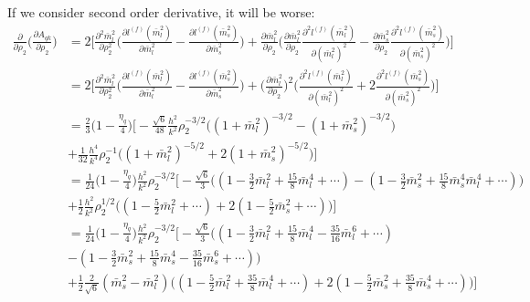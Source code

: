 \documentclass[12pt]{article}
\begin{document}
If we consider second order derivative, it will be worse:
\begin{equation}
\begin{split}
\frac{\partial}{\partial \rho_2}\Big(\frac{\partial A_{qk}}{\partial \rho_2}\Big)
&= 2 \Big[\frac{\partial^2 \bar m_l^2}{\partial \rho_2^2}\Big(\frac{\partial l^{(f)}(\bar m_l^2)}{\partial \bar m_l^2} - \frac{\partial l^{(f)}(\bar m_s^2)}{\partial \bar m_s^2}\Big)
+ \frac{\partial \bar m_l^2}{\partial \rho_2} \Big(\frac{\partial \bar m_l^2}{\partial \rho_2} \frac{\partial^2 l^{(f)}(\bar m_l^2)}{\partial (\bar m_l^2)^2} - \frac{\partial \bar m_s^2}{\partial \rho_2} \frac{\partial^2 l^{(f)}(\bar m_s^2)}{\partial (\bar m_s^2)^2 }\Big) \Big]\\
&= 2 \Big[\frac{\partial^2 \bar m_l^2}{\partial \rho_2^2}\Big(\frac{\partial l^{(f)}(\bar m_l^2)}{\partial \bar m_l^2} - \frac{\partial l^{(f)}(\bar m_s^2)}{\partial \bar m_s^2}\Big)
+\Big(\frac{\partial \bar m_l^2}{\partial \rho_2}\Big)^2\Big(\frac{\partial^2 l^{(f)}(\bar m_l^2)}{\partial (\bar m_l^2)^2} + 2 \frac{\partial^2 l^{(f)}(\bar m_s^2)}{\partial (\bar m_s^2)^2 }\Big) \Big]\\
&=\frac{2}{3}\Big(1-\frac{\eta_q}{4}\Big)\Big[-\frac{\sqrt{6}}{48} \frac{h^2}{k^2} \rho_2^{-3/2} \big((1+\bar m_l^2 )^{-3/2}-(1+\bar m_s^2)^{-3/2}\big ) \\
&+\frac{1}{32}\frac{h^4}{k^4}\rho_2^{-1}\big( (1+\bar m_l^2 )^{-5/2} +2 (1+\bar m_s^2)^{-5/2}\big)\Big]\\
&=\frac{1}{24}\Big(1-\frac{\eta_q}{4}\Big)\frac{h^2}{k^2}\rho_2^{-3/2} \Big[-\frac{\sqrt{6}}{3} \big((1-\frac{3}{2} \bar m_l^2 + \frac{15}{8} \bar m_l^4 +\cdots )-(1-\frac{3}{2}\bar m_s^2 + \frac{15}{8} \bar m_s^4 \bar m_l^4 + \cdots)\big ) \\
&+\frac{1}{2}\frac{h^2}{k^2}\rho_2^{1/2}\big( (1-\frac{5}{2}\bar m_l^2 + \cdots) + 2(1-\frac{5}{2}\bar m_s^2 +\cdots)\big)\Big]\\
&=\frac{1}{24}\Big(1-\frac{\eta_q}{4}\Big)\frac{h^2}{k^2}\rho_2^{-3/2} \Big[-\frac{\sqrt{6}}{3} \big((1-\frac{3}{2} \bar m_l^2 + \frac{15}{8} \bar m_l^4 -\frac{35}{16}\bar m_l^6 +\cdots )\\
&-(1-\frac{3}{2}\bar m_s^2 + \frac{15}{8} \bar m_s^4 -\frac{35}{16}\bar m_s^6 + \cdots)\big ) \\
&+\frac{1}{2}\frac{2}{\sqrt{6}}(\bar m_s^2 - \bar m_l^2)\big( (1-\frac{5}{2}\bar m_l^2 + \frac{35}{8} \bar m_l^4+\cdots) + 2(1-\frac{5}{2}\bar m_s^2 +\frac{35}{8} \bar m_s^4+\cdots)\big)\Big]
\end{split}
\end{equation}
\end{document}
